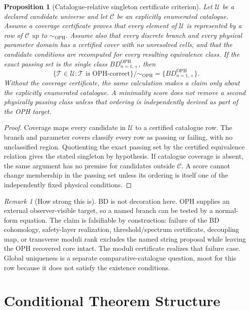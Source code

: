 \documentclass[11pt]{article}
\newtheorem{proposition}[theorem]{Proposition}
\theoremstyle{remark}
\newtheorem{remark}[theorem]{Remark}
\theoremstyle{plain}
\newcommand{\OPH}{\mathrm{OPH}}
\newcommand{\Teq}{\sim_{\OPH}}
\begin{document}
\begin{proposition}[Catalogue-relative singleton certificate criterion]
Let \(\mathcal U\) be a declared candidate universe and let \(\mathcal C\) be an explicitly
enumerated catalogue. Assume a coverage certificate proves that every element of \(\mathcal U\)
is represented by a row of \(\mathcal C\) up to \(\Teq\). Assume also that every discrete branch
and every physical parameter domain has a certified cover with no unresolved cells, and that the
candidate conditions are recomputed for every resulting equivalence class. If the exact passing set is
the single class \(BD_{n=1,+}^{\OPH}\), then
\[
\boxed{
\{
\mathcal T\in\mathcal U:\mathcal T\text{ is OPH-correct}
\}/\Teq
=
\{BD_{n=1,+}^{\OPH}\}.
}
\]
Without the coverage certificate, the same calculation makes a claim only about the explicitly
enumerated catalogue. A minimality score does not remove a second physically passing class unless
that ordering is independently derived as part of the OPH target.
\end{proposition}

\begin{proof}
Coverage maps every candidate in \(\mathcal U\) to a certified catalogue row. The branch and
parameter covers classify every row as passing or failing, with no unclassified region. Quotienting
the exact passing set by the certified equivalence relation gives the stated singleton by
hypothesis. If catalogue coverage is absent, the same argument has no premise for candidates
outside \(\mathcal C\). A score cannot change membership in the passing set unless its ordering is
itself one of the independently fixed physical conditions.
\end{proof}

\begin{remark}[How strong this is]
BD is not decoration here. OPH supplies an external observer-visible target, so a named branch can
be tested by a normal-form equation. The claim is falsifiable by construction: failure of the BD
cohomology, safety-layer realization, threshold/spectrum certificate, decoupling map, or transverse
moduli rank excludes the named string proposal while leaving the OPH recovered core intact. The
moduli certificate realizes that failure case. Global uniqueness is a separate
comparative-catalogue question, moot for this row because it does not satisfy the existence
conditions.
\end{remark}

\section{Conditional Theorem Structure}
\end{document}
